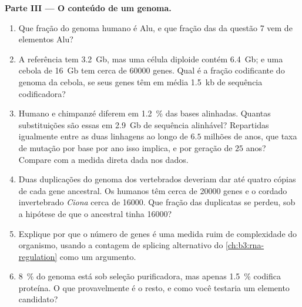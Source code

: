 \begin{problem}
\medskip
\noindent\textbf{Parte III --- O conteúdo de um genoma.}
\begin{enumerate}[resume]
  \item Que fração do genoma humano é Alu, e que fração das  da
        questão 7 vem de elementos Alu?
  \item A referência tem \qty{3.2}{Gb}, mas uma célula diploide contém
        \qty{6.4}{Gb}; e uma cebola de \qty{16}{Gb} tem cerca de
        \num{60000} genes. Qual é a fração codificante do genoma da
        cebola, se seus genes têm em média \qty{1.5}{kb} de sequência
        codificadora?
  \item Humano e chimpanzé diferem em \qty{1.2}{\%} das bases
        alinhadas. Quantas substituições são essas em \qty{2.9}{Gb} de
        sequência alinhável? Repartidas igualmente entre as duas
        linhagens ao longo de $6.5$ milhões de anos, que taxa de
        mutação por base por ano isso implica, e por geração de $25$
        anos? Compare com a medida direta dada nos dados.
  \item Duas duplicações do genoma dos vertebrados deveriam dar até
        quatro cópias de cada gene ancestral. Os humanos têm cerca de
        \num{20000} genes e o cordado invertebrado \emph{Ciona} cerca
        de \num{16000}. Que fração das duplicatas se perdeu, sob a
        hipótese de que o ancestral tinha \num{16000}?
  \item Explique por que o número de genes é uma medida ruim de
        complexidade do organismo, usando a contagem de splicing
        alternativo do \cref{ch:b3:rna-regulation} como um argumento.
  \item \qty{8}{\%} do genoma está sob seleção purificadora, mas apenas
        \qty{1.5}{\%} codifica proteína. O que provavelmente é o resto,
        e como você testaria um elemento candidato?
\end{enumerate}


\end{problem}

